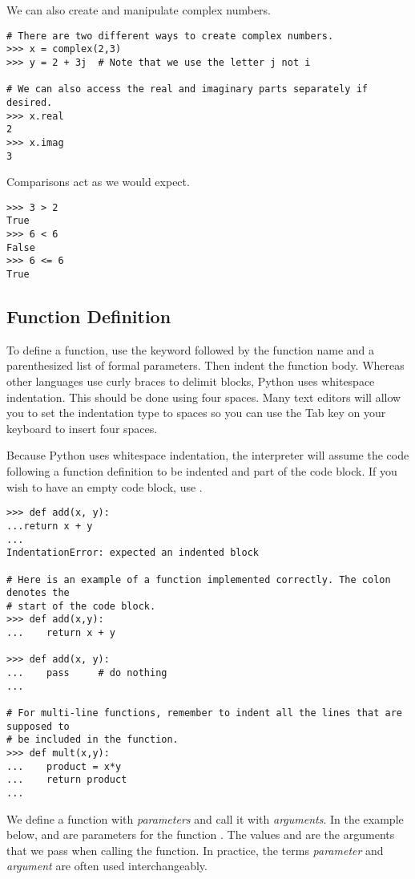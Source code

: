 We can also create and manipulate complex numbers.
\begin{lstlisting}
# There are two different ways to create complex numbers.
>>> x = complex(2,3)
>>> y = 2 + 3j	# Note that we use the letter j not i

# We can also access the real and imaginary parts separately if desired.
>>> x.real
2
>>> x.imag
3
\end{lstlisting}

Comparisons act as we would expect.
\begin{lstlisting}
>>> 3 > 2
True
>>> 6 < 6
False
>>> 6 <= 6
True
\end{lstlisting}


\subsection*{Function Definition}
To define a function, use the  keyword followed by the function name and a parenthesized list of formal parameters. Then indent the function body.  Whereas other languages use curly braces to delimit blocks, Python uses whitespace indentation.  This should be done using four spaces.  Many text editors will allow you to set the indentation type to spaces so you can use the Tab key on your keyboard to insert four spaces.

Because Python uses whitespace indentation, the interpreter will assume the code following a function definition to be indented and part of the code block.  If you wish to have an empty code block, use .
\begin{lstlisting}
>>> def add(x, y):
...return x + y
...
IndentationError: expected an indented block

# Here is an example of a function implemented correctly. The colon denotes the
# start of the code block.
>>> def add(x,y):
...    return x + y

>>> def add(x, y):
...    pass		# do nothing
...

# For multi-line functions, remember to indent all the lines that are supposed to
# be included in the function.
>>> def mult(x,y):
...    product = x*y
...    return product
...
\end{lstlisting}

We define a function with \emph{parameters} and call it with \emph{arguments}. In the example below,  and  are parameters for the function . The values  and  are the arguments that we pass when calling the function. In practice, the terms \emph{parameter} and \emph{argument} are often used interchangeably.

